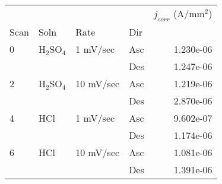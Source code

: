 \begin{tabular}{llllr}
\toprule
  &     &           &     &  $j_{corr}$ (A/mm$^2$) \\
Scan & Soln & Rate & Dir &                        \\
\midrule
0 & H$_2$SO$_4$ & 1 mV/sec & Asc &              1.230e-06 \\
  &     &           & Des &              1.247e-06 \\
2 & H$_2$SO$_4$ & 10 mV/sec & Asc &              1.219e-06 \\
  &     &           & Des &              2.870e-06 \\
4 & HCl & 1 mV/sec & Asc &              9.602e-07 \\
  &     &           & Des &              1.174e-06 \\
6 & HCl & 10 mV/sec & Asc &              1.081e-06 \\
  &     &           & Des &              1.391e-06 \\
\bottomrule
\end{tabular}
